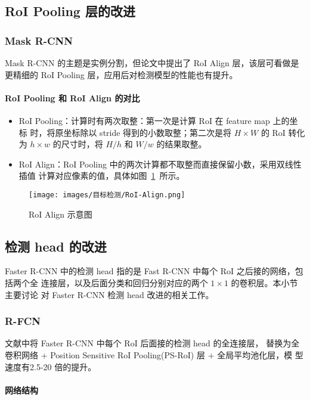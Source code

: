 \subsection{RoI Pooling 层的改进}
\subsubsection{Mask R-CNN}
Mask R-CNN 的主题是实例分割，但论文中提出了 RoI Align 层，该层可看做是更精细的 RoI
Pooling 层，应用后对检测模型的性能也有提升。

\paragraph{RoI Pooling 和 RoI Align 的对比}

\begin{itemize}
  \item RoI Pooling：计算时有两次取整：第一次是计算 RoI 在 feature map 上的坐标
    时，将原坐标除以 stride 得到的小数取整；第二次是将 $H \times W$ 的 RoI 转化为 $h
    \times w$ 的尺寸时，将 $H/h$ 和 $W/w$ 的结果取整。
  \item RoI Align：RoI Pooling 中的两次计算都不取整而直接保留小数，采用双线性插值
    计算对应像素的值，具体如图~\ref{fig:roi-align}~所示。
\end{itemize}

\begin{figure}[ht]
  \centering
  \texttt{[image: images/目标检测/RoI-Align.png]}
  \caption{RoI Align 示意图}
  \label{fig:roi-align}
\end{figure}

\subsection{检测 head 的改进}
Faster R-CNN 中的检测 head 指的是 Fast R-CNN 中每个 RoI 之后接的网络，包括两个全
连接层，以及后面分类和回归分别对应的两个 $1 \times 1$ 的卷积层。本小节主要讨论
对 Faster R-CNN 检测 head 改进的相关工作。

\subsubsection{R-FCN}
文献中将 Faster R-CNN 中每个 RoI 后面接的检测 head 的全连接层，
替换为全卷积网络 + Position Sensitive RoI Pooling(PS-RoI) 层 + 全局平均池化层，模
型速度有2.5-20 倍的提升。

\paragraph{网络结构}

